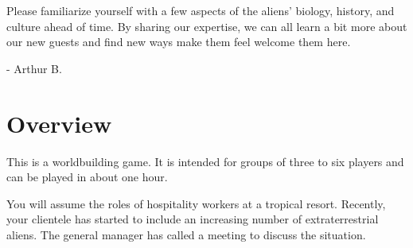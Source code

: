 \documentclass[a6paper, 11pt, parskip=half, DIV=15]{scrartcl}
\begin{document}
Please familiarize yourself with a few aspects of the aliens' biology, history, and culture ahead of time.
By sharing our expertise, we can all learn a bit more about our new guests and find new ways make them feel welcome them here.

\hspace{4.5cm}\huge\setmainfont{Caveat}- Arthur B.
\setmainfont{Quicksand}
\normalsize

\newpage
\enlargethispage{1.75\baselineskip}

\section*{Overview}
This is a worldbuilding game. It is intended for groups of three to six players and can be played in about one hour.

You will assume the roles of hospitality workers at a tropical resort. Recently, your clientele has started to include an increasing number of extraterrestrial aliens. The general manager has called a meeting to discuss the situation.

\vfill

\begin{center}
\end{center}
\end{document}
